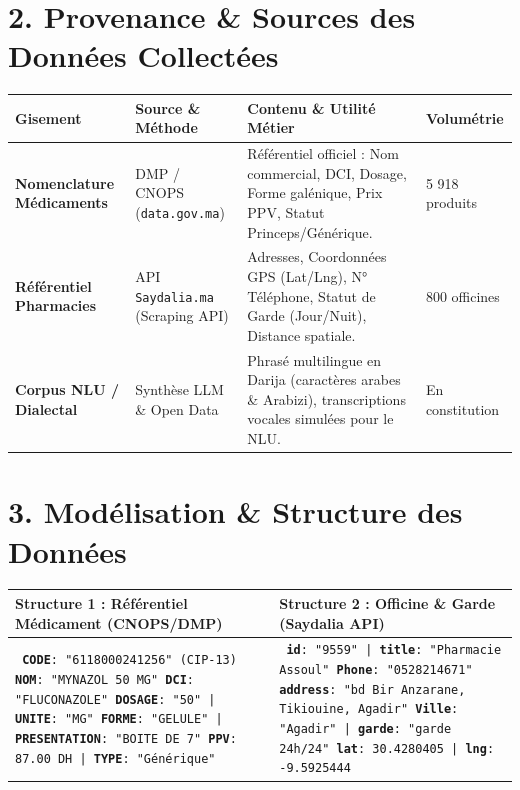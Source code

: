 \documentclass[10pt,a4paper]{article}
\begin{document}
\section*{2. Provenance \& Sources des Données Collectées}
\renewcommand{\arraystretch}{1.35}
\begin{small}
\begin{tabularx}{\textwidth}{@{}l p{4.2cm} X l@{}}
\toprule
\textbf{Gisement} & \textbf{Source \& Méthode} & \textbf{Contenu \& Utilité Métier} & \textbf{Volumétrie} \\
\midrule
\textbf{Nomenclature Médicaments} & DMP / CNOPS (\texttt{data.gov.ma}) & Référentiel officiel : Nom commercial, DCI, Dosage, Forme galénique, Prix PPV, Statut Princeps/Générique. & 5 918 produits \\
\textbf{Référentiel Pharmacies} & API \texttt{Saydalia.ma} (Scraping API) & Adresses, Coordonnées GPS (Lat/Lng), N° Téléphone, Statut de Garde (Jour/Nuit), Distance spatiale. & 800 officines \\
\textbf{Corpus NLU / Dialectal} & Synthèse LLM \& Open Data & Phrasé multilingue en Darija (caractères arabes \& Arabizi), transcriptions vocales simulées pour le NLU. & En constitution \\
\bottomrule
\end{tabularx}
\end{small}

\vspace{0.25cm}

\section*{3. Modélisation \& Structure des Données}
\renewcommand{\arraystretch}{1.2}
\begin{small}
\begin{tabularx}{\textwidth}{@{}X X@{}}
\textbf{Structure 1 : Référentiel Médicament (CNOPS/DMP)} & \textbf{Structure 2 : Officine \& Garde (Saydalia API)} \\
\midrule
\texttt{\small
\textbf{CODE}: "6118000241256" (CIP-13)\newline
\textbf{NOM}: "MYNAZOL 50 MG"\newline
\textbf{DCI}: "FLUCONAZOLE"\newline
\textbf{DOSAGE}: "50" | \textbf{UNITE}: "MG"\newline
\textbf{FORME}: "GELULE" | \textbf{PRESENTATION}: "BOITE DE 7"\newline
\textbf{PPV}: 87.00 DH | \textbf{TYPE}: "Générique"
} &
\texttt{\small
\textbf{id}: "9559" | \textbf{title}: "Pharmacie Assoul"\newline
\textbf{Phone}: "0528214671"\newline
\textbf{address}: "bd Bir Anzarane, Tikiouine, Agadir"\newline
\textbf{Ville}: "Agadir" | \textbf{garde}: "garde 24h/24"\newline
\textbf{lat}: 30.4280405 | \textbf{lng}: -9.5925444
} \\
\bottomrule
\end{tabularx}
\end{small}
\end{document}
